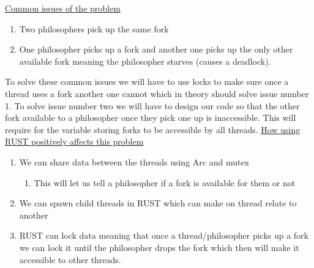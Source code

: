 \documentclass[conference]{IEEEtran}
\begin{document}
	 \underline{Common issues of the problem}
	 \begin{enumerate}
	 	\item Two philosophers pick up the same fork
	 	\item One philosopher picks up a fork and another one picks up the only other available fork meaning the philosopher starves (causes a deadlock).
	 \end{enumerate}
	 To solve these common issues we will have to use locks to make sure once a thread uses a fork another one cannot which in theory should solve issue number 1. To solve issue number two we will have to design our code so that the other fork available to a philosopher once they pick one up is inaccessible. This will require for the variable storing forks to be accessible by all threads.
	 \linebreak
	 \underline{How using RUST positively affects this problem}
	 \begin{enumerate}
	 	\item We can share data between the threads using Arc and mutex
	 	\begin{enumerate}
	 		
	 		\item This will let us tell a philosopher if a fork is available for them or not
	 	\end{enumerate}
	 	\item We can spawn child threads in RUST which can make on thread relate to another
	 	\item RUST can lock data meaning that once a thread/philosopher picks up a fork we can lock it until the philosopher drops the fork which then will make it accessible to other threads.

	\end{enumerate}
	 
	
	
\end{document}
